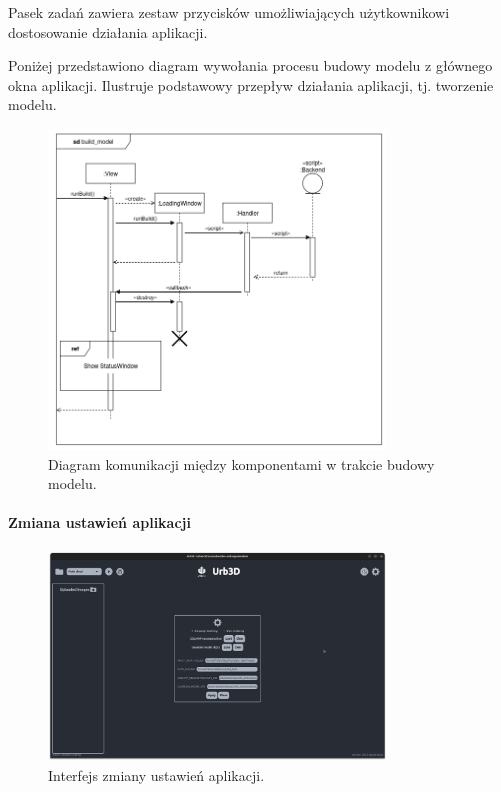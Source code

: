 Pasek zadań zawiera zestaw przycisków umożliwiających użytkownikowi dostosowanie działania aplikacji. 

Poniżej przedstawiono diagram wywołania procesu budowy modelu z głównego okna aplikacji. Ilustruje podstawowy przepływ działania aplikacji, tj. tworzenie modelu.

\begin{figure}[h!]
    \centering
    \includegraphics[width=0.8\textwidth]{img/diagramy/diagram_sekw_build.png}
    \caption{Diagram komunikacji między komponentami w trakcie budowy modelu.}
\end{figure}

\paragraph{Zmiana ustawień aplikacji}
\begin{figure}[h!]
    \centering
    \includegraphics[width=0.8\textwidth]{img/wizualizacja/ui_ustawienia.png}
    \caption{Interfejs zmiany ustawień aplikacji.}
\end{figure}

